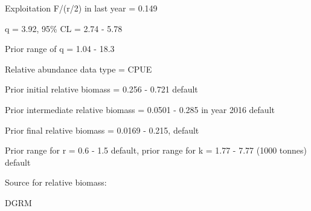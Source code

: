 \documentclass[12pt,a4paper]{article}\usepackage[]{graphicx}\usepackage[]{xcolor}
\begin{document}
Exploitation F/(r/2) in last year = 0.149

q = 3.92, 95\% CL = 2.74 - 5.78

Prior range of q = 1.04 - 18.3

Relative abundance data type = CPUE

Prior initial relative biomass = 0.256 - 0.721 default

Prior intermediate relative biomass = 0.0501 - 0.285 in year 2016 default

Prior final relative biomass = 0.0169 - 0.215, default

Prior range for r = 0.6 - 1.5 default, prior range for k = 1.77 - 7.77 (1000 tonnes) default

Source for relative biomass: 

DGRM

    
\end{document}
